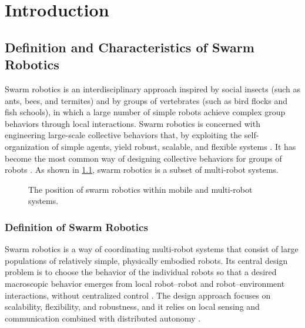\chapter{Introduction}\label{chap:introduction}

\section{Definition and Characteristics of Swarm Robotics}\label{sec:definition}

Swarm robotics is an interdisciplinary approach inspired by social insects (such
as ants, bees, and termites) and by groups of vertebrates (such as bird flocks
and fish schools), in which a large number of simple robots achieve complex group
behaviors through local interactions. Swarm robotics is concerned with
engineering large-scale collective behaviors that, by exploiting the
self-organization of simple agents, yield robust, scalable, and flexible systems
\cite{dias2021swarm,tan2013research}. It has become the most common way of
designing collective behaviors for groups of robots \cite{brambilla2013swarm}.
As shown in \cref{fig:swarm-position}, swarm robotics is a subset of multi-robot
systems.

\begin{figure}[htbp]
  \centering
  \caption{The position of swarm robotics within mobile and multi-robot systems.}
  \label{fig:swarm-position}
\end{figure}

\subsection{Definition of Swarm Robotics}

Swarm robotics is a way of coordinating multi-robot systems that consist of large
populations of relatively simple, physically embodied robots. Its central design
problem is to choose the behavior of the individual robots so that a desired
macroscopic behavior emerges from local robot--robot and robot--environment
interactions, without centralized control \cite{brambilla2013swarm,sahin2005swarm}.
The design approach focuses on scalability, flexibility, and robustness, and it
relies on local sensing and communication combined with distributed autonomy
\cite{dias2021swarm,tan2013research}.

